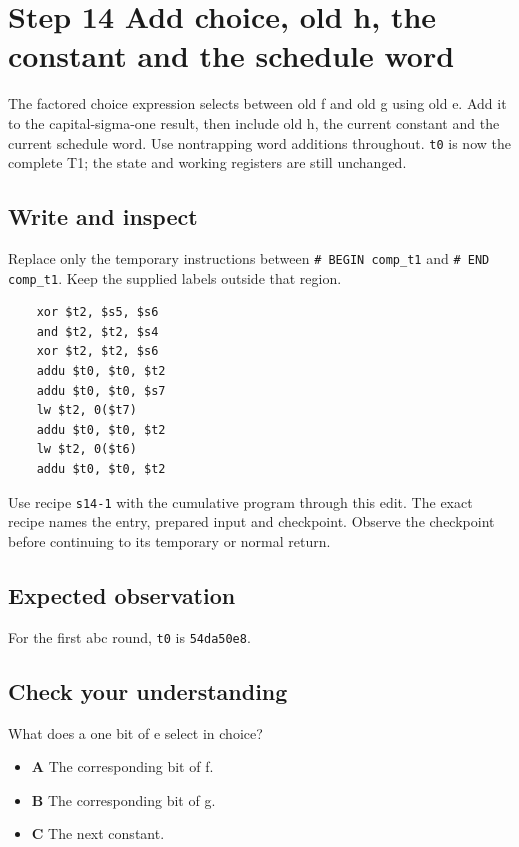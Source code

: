 \section{Step 14 Add choice, old h, the constant and the schedule word}\label{sha-s14}

The factored choice expression selects between old f and old g using old e. Add it to the capital-sigma-one result, then include old h, the current constant and the current schedule word. Use nontrapping word additions throughout. \texttt{t0} is now the complete T1; the state and working registers are still unchanged.

\subsection{Write and inspect}
Replace only the temporary instructions between \texttt{\# BEGIN comp\_t1} and \texttt{\# END comp\_t1}. Keep the supplied labels outside that region.

\begin{verbatim}
    xor $t2, $s5, $s6
    and $t2, $t2, $s4
    xor $t2, $t2, $s6
    addu $t0, $t0, $t2
    addu $t0, $t0, $s7
    lw $t2, 0($t7)
    addu $t0, $t0, $t2
    lw $t2, 0($t6)
    addu $t0, $t0, $t2
\end{verbatim}

Use recipe \texttt{s14-1} with the cumulative program through this edit. The exact recipe names the entry, prepared input and checkpoint. Observe the checkpoint before continuing to its temporary or normal return.

\subsection{Expected observation}
For the first abc round, \texttt{t0} is \texttt{54da50e8}.

\subsection{Check your understanding}
What does a one bit of e select in choice?

\begin{itemize}
  \item \textbf{A} The corresponding bit of f.
  \item \textbf{B} The corresponding bit of g.
  \item \textbf{C} The next constant.
\end{itemize}
